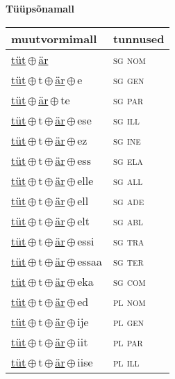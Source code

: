 

\vspace{3.5em}
\noindent \begin{minipage}{\textwidth}
\noindent \textbf{Tüüpsõnamall \,}\\

\begin{sideways}
\begin{tabular}{l l}
muutvormimall & tunnused \\
\hline
\underline{tüt}\,$\oplus$\,\underline{är} & \textsc{ sg nom } \\
\underline{tüt}\,$\oplus$\,t\,$\oplus$\,\underline{är}\,$\oplus$\,e & \textsc{ sg gen } \\
\underline{tüt}\,$\oplus$\,\underline{är}\,$\oplus$\,te & \textsc{ sg par } \\
\underline{tüt}\,$\oplus$\,t\,$\oplus$\,\underline{är}\,$\oplus$\,ese & \textsc{ sg ill } \\
\underline{tüt}\,$\oplus$\,t\,$\oplus$\,\underline{är}\,$\oplus$\,ez & \textsc{ sg ine } \\
\underline{tüt}\,$\oplus$\,t\,$\oplus$\,\underline{är}\,$\oplus$\,ess & \textsc{ sg ela } \\
\underline{tüt}\,$\oplus$\,t\,$\oplus$\,\underline{är}\,$\oplus$\,elle & \textsc{ sg all } \\
\underline{tüt}\,$\oplus$\,t\,$\oplus$\,\underline{är}\,$\oplus$\,ell & \textsc{ sg ade } \\
\underline{tüt}\,$\oplus$\,t\,$\oplus$\,\underline{är}\,$\oplus$\,elt & \textsc{ sg abl } \\
\underline{tüt}\,$\oplus$\,t\,$\oplus$\,\underline{är}\,$\oplus$\,essi & \textsc{ sg tra } \\
\underline{tüt}\,$\oplus$\,t\,$\oplus$\,\underline{är}\,$\oplus$\,essaa & \textsc{ sg ter } \\
\underline{tüt}\,$\oplus$\,t\,$\oplus$\,\underline{är}\,$\oplus$\,eka & \textsc{ sg com } \\
\underline{tüt}\,$\oplus$\,t\,$\oplus$\,\underline{är}\,$\oplus$\,ed & \textsc{ pl nom } \\
\underline{tüt}\,$\oplus$\,t\,$\oplus$\,\underline{är}\,$\oplus$\,ije & \textsc{ pl gen } \\
\underline{tüt}\,$\oplus$\,t\,$\oplus$\,\underline{är}\,$\oplus$\,iit & \textsc{ pl par } \\
\underline{tüt}\,$\oplus$\,t\,$\oplus$\,\underline{är}\,$\oplus$\,iise & \textsc{ pl ill } \\

\end{tabular}
\end{sideways}
\end{minipage}
